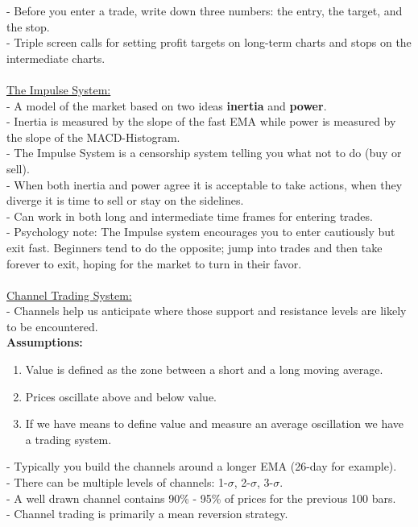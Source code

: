 \documentclass[12pt,fullpage]{article}
\begin{document}
- Before you enter a trade, write down three numbers: the entry, the target, and the stop.\\
- Triple screen calls for setting profit targets on long-term charts and stops on the intermediate charts.\\
\\
\underline{The Impulse System:}\\ 
- A model of the market based on two ideas \textbf{inertia} and \textbf{power}.\\
- Inertia is measured by the slope of the fast EMA while power is measured by the slope of the MACD-Histogram.\\
- The Impulse System is a censorship system telling you what not to do (buy or sell).\\
- When both inertia and power agree it is acceptable to take actions, when they diverge it is time to sell or stay on the sidelines.\\
- Can work in both long and intermediate time frames for entering trades.\\
- Psychology note: The Impulse system encourages you to enter cautiously but exit fast. Beginners tend to do the opposite; jump into trades and then take forever to exit, hoping for the market to turn in their favor.\\
\\
\underline{Channel Trading System:}\\
- Channels help us anticipate where those support and resistance levels are likely to be encountered.\\
\textbf{Assumptions:} 
\begin{enumerate}
   \itemsep0em
   \item Value is defined as the zone between a short and a long moving average.
   \item Prices oscillate above and below value.
   \item If we have means to define value and measure an average oscillation we have a trading system.
\end{enumerate}
- Typically you build the channels around a longer EMA (26-day for example).\\
- There can be multiple levels of channels: 1-$\sigma$, 2-$\sigma$, 3-$\sigma$.\\
- A well drawn channel contains 90\% - 95\% of prices for the previous 100 bars.\\
- Channel trading is primarily a mean reversion strategy.\\
\end{document}

